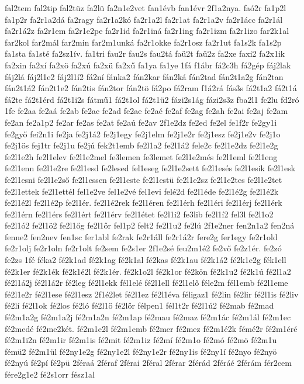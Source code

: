 {fal2tem
fal2tip
fal2tüz
fa2lü
fa2n1e2vet
fan1évb
fan1évr
2f1a2nya.
faó2r
fa1p2l
fa1p2r
fa2r1a2dá
fa2ragy
fa2r1a2kó
fa2r1a2l
fa2r1at
fa2r1a2v
fa2r1ácc
fa2r1ál
fa2r1á2z
fa2r1em
fa2r1e2pe
fa2r1id
fa2r1iná
fa2r1ing
fa2r1izm
fa2r1izo
far2k1al
far2kol
far2mál
far2min
far2m1unká
fa2r1okke
fa2r1osz
fa2r1ut
fa1s2k
fa1s2p
fa1sta
fa1sté
fa2sz1ív.
fa1tri
fau2r
fau2s
fau2tá
faü2t
faü2z
fa2xe
faxi2
fa2x1ik
fa2xin
fa2xí
fa2xö
fa2xú
fa2xü
fa2xű
fa1ya
fa1ye
1fá
f1ábr
fá2c3h
fá2gép
fáj2lak
fáj2lá
fáj2l1e2
fáj2l1í2
fá2ní
fánka2
fán2kar
fán2ká
fán2tad
fán2t1a2g
fán2tan
fán2t1á2
fán2t1e2
fán2tis
fán2tor
fán2tö
fá2po
fá2ram
f1á2rá
fás3s
fá2t1a2
fá2t1á
fá2te
fá2t1érd
fá2t1i2s
fátmű1
fá2t1ol
fá2t1ü2
fázi2s1ág
fázi2s3z
fba2l1
fc2lu
fd2ró
1fe
fe2aa
fe2aá
fe2ab
fe2ac
fe2ad
fe2ae
fe2aé
fe2af
fe2ag
fe2ah
fe2ai
fe2aj
fe2am
fe2an
fe2a1p2
fe2ar
fe2as
fe2at
fe2aú
fe2av
2f1e2dz
fe2ed
fe2el
fe1f2r
fe2gy1i
fe2győ
fei2n1i
fe2ja
fe2j1á2
fe2j1egy
fe2j1elm
fe2j1e2r
fe2j1esz
fe2j1e2v
fe2j1o
fe2j1ös
fej1tr
fe2j1u
fe2jú
fek2t1emb
fe2l1a2
fe2l1á2
fele2c
fe2l1e2dz
fe2l1e2g
fe2l1e2h
fe2l1elev
fe2l1e2mel
fe3lemen
fe3lemet
fe2l1e2més
fe2l1eml
fe2l1eng
fe2l1enn
fe2l1e2re
fe2l1esd
fe2lesed
fel1eseg
fe2l1e2sett
fe2l1esés
fe2l1esik
fe2l1esk
fe2l1esni
fe2l1e2ső
fe2l1essen
fe2l1este
fe2l1estü
fe2l1e2sz
fe2l1e2tes
fe2l1e2tet
fe2l1ettek
fe2l1ettél
fel1e2ve
fel1e2vé
fel1evi
felé2d
fe2l1éde
fe2l1é2g
fe2l1é2k
fe2l1é2l
fe2l1é2p
fe2l1ér.
fe2l1é2rek
fe2l1éren
fe2l1érh
fe2l1éri
fe2l1érj
fe2l1érk
fe2l1érn
fe2l1érs
fe2l1ért
fe2l1érv
fe2l1étet
fe2l1i2
fe3lib
fe2l1í2
fel3l
fe2l1o2
fe2l1ó2
fe2l1ö2
fe2l1őg
fe2l1őr
fel1p2
felt2
fe2l1u2
fe2lú
2f1e2ner
fen2n1a2
fen2ná
fenne2
fen2nev
fen1sc
fer1abl
fe2rak
fe2r1áll
fe2r1á2r
fere2g
fer1egy
fe2r1old
fe2r1olj
fe2r1oln
fe2r1olt
fe2sem
fe2s1er
2f1e2sé
feu2m1é2
fe2vő
fe2z1ér.
fe2zó
fe2zs
1fé
féka2
fé2k1ad
fé2k1ag
fé2k1al
fé2kas
fé2k1au
fé2k1á2
fé2k1e2g
fék1ell
fé2k1er
fé2k1ék
fé2k1é2l
fé2k1ér.
fé2k1o2l
fé2k1or
fé2kön
fé2k1u2
fé2k1ú
fé2l1a2
fé2l1á2j
fé2l1á2r
fé2leg
fé2l1ekk
fél1elé
fé2l1ell
fé2l1elő
féle2m
fél1emb
fé2l1eme
fé2l1e2r
fé2l1ese
fé2l1esz
2f1é2let
fé2l1ez
fé2l1éva
féligaz1
fé2lin
fé2lir
fé2l1is
fé2liv
fé2lí
fé2l1ok
fé2los
fé2ló
fé2l1ö
fé2lőr
félpen1
fél1t2r
fé2l1ú2
fé2mab
fé2mad
fé2m1a2g
fé2m1a2j
fé2m1a2n
fé2m1ap
fé2mau
fé2maz
fé2m1ác
fé2m1ál
fé2m1ec
fé2medé
fé2me2két.
fé2m1e2l
fé2m1emb
fé2mer
fé2mez
fé2m1é2k
fémé2r
fé2m1éré
fé2m1i2n
fé2m1ir
fé2m1is
fé2mit
fé2m1iz
fé2mí
fé2m1o
fé2mó
fé2mö
fé2m1u
fémü2
fé2m1ül
fé2ny1e2g
fé2ny1e2l
fé2ny1e2r
fé2ny1is
fé2ny1í
fé2nyo
fé2nyö
fé2nyú
fé2pí
fé2pü
2féraá
2féraf
2férai
2féral
2férar
2férád
2féráé
2férám
fér2cem
fére2g1e2
fé2s1orr
fész1al
}
